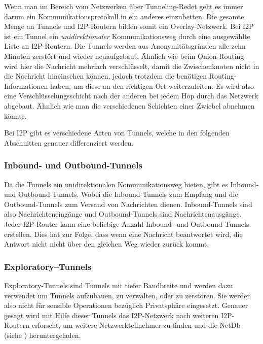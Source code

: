 Wenn man im Bereich vom Netzwerken über Tunneling-Redet geht es immer darum ein Kommunikationsprotokoll in ein anderes einzubetten. \parencite{noauthor_duden_nodate}
Die gesamte Menge an Tunnels und I2P-Routern bilden somit ein Overlay-Netzwerk.
Bei I2P ist ein Tunnel ein \textit{unidirektionaler} Kommunikationsweg durch eine ausgewählte Liste an I2P-Routern.
Die Tunnels werden aus Anonymitätsgründen alle zehn Minuten zerstört und wieder neuaufgebaut.
Ähnlich wie beim Onion-Routing wird hier die Nachricht mehrfach verschlüsselt, damit die Zwischenknoten nicht in die Nachricht hineinsehen können, jedoch trotzdem die benötigen Routing-Informationen haben, um diese an den richtigen Ort weiterzuleiten.
Es wird also eine Verschlüsselungsschicht nach der anderen bei jedem Hop durch das Netzwerk abgebaut.
Ähnlich wie man die verschiedenen Schichten einer Zwiebel abnehmen könnte.

Bei I2P gibt es verschiedene Arten von Tunnels, welche in den folgenden Abschnitten genauer differenziert werden.
\parencites{noauthor_intro_nodate}[S.~2]{liu_empirical_2014}

\subsubsection{Inbound- und Outbound-Tunnels}
Da die Tunnels ein unidirektionalen Kommunikationsweg bieten, gibt es Inbound- und Outbound-Tunnels.
Wobei die Inbound-Tunnels zum Empfang und die Outbound-Tunnels zum Versand von Nachrichten dienen.
Inbound-Tunnels sind also Nachrichteneingänge und Outbound-Tunnels sind Nachrichtenausgänge.
Jeder I2P-Router kann eine beliebige Anzahl Inbound- und Outbound Tunnels erstellen.
Dies hat zur Folge, dass wenn eine Nachricht beantwortet wird, die Antwort nicht nicht über den gleichen Weg wieder zurück kommt.
\parencite{noauthor_intro_nodate}

\subsubsection{Exploratory--Tunnels}

Exploratory-Tunnels sind Tunnels mit tiefer Bandbreite und werden dazu verwendet um Tunnels aufzubauen, zu verwalten, oder zu zerstören.
Sie werden also nicht für sensible Operationen bezüglich Privatsphäre eingesetzt.
Genauer gesagt wird mit Hilfe dieser Tunnels das I2P-Netzwerk nach weiteren I2P-Routern erforscht, um weitere Netzwerkteilnehmer zu finden und die NetDb (siehe ) heruntergeladen.
\parencite[S.~4]{conrad_survey_2014}

